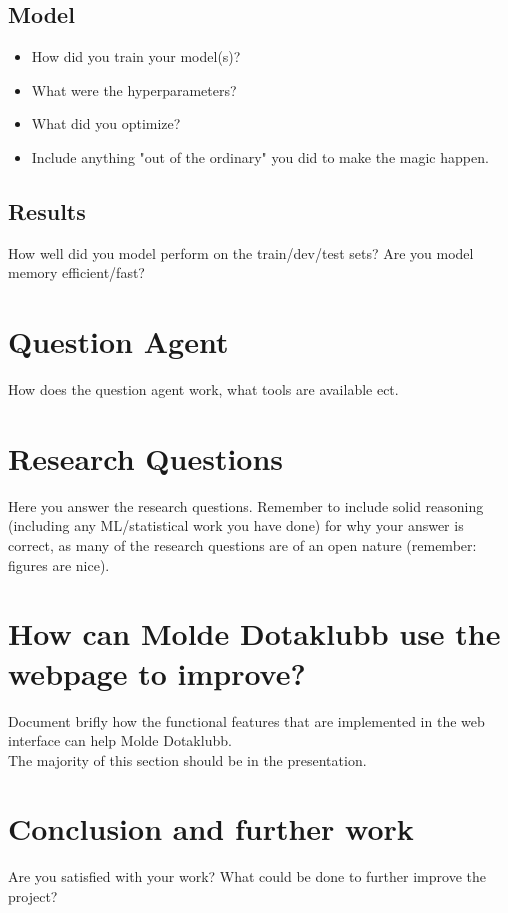 \documentclass{article}
\begin{document}
\subsection{Model}
\begin{itemize}
    \item How did you train your model(s)? 
    \item  What were the hyperparameters?
    \item  What did you optimize?
    \item  Include anything "out of the ordinary" you did to make the magic happen.
\end{itemize}

\subsection{Results}
How well did you model perform on the train/dev/test sets? Are you model memory efficient/fast?

\section{Question Agent}
How does the question agent work, what tools are available ect.

\section{Research Questions}
Here you answer the research questions. Remember to include solid reasoning (including any ML/statistical work you have done) for why your answer is correct, as many of the research questions are of an open nature (remember: figures are nice).



\section{How can Molde Dotaklubb use the webpage to improve?}
Document brifly how the functional features that are implemented in the web interface can help Molde Dotaklubb.\\
The majority of this section should be in the presentation.


\section{Conclusion and further work}
Are you satisfied with your work? What could be done to further improve the project?
\end{document}

